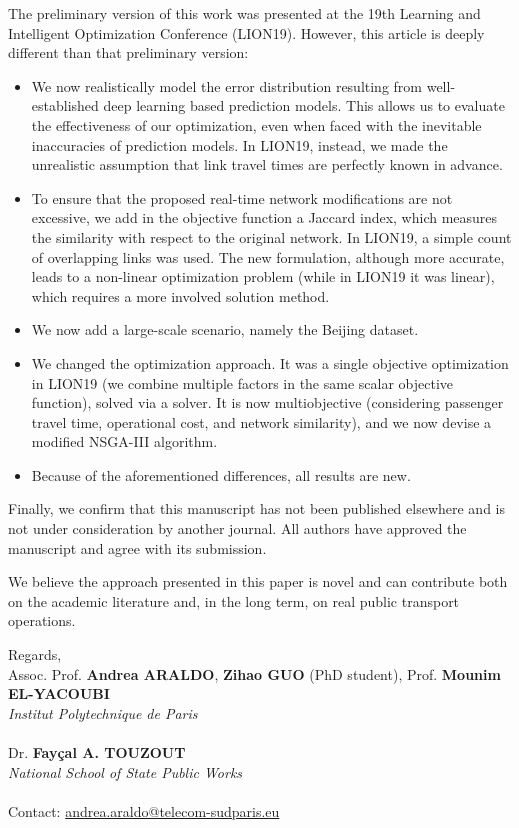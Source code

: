 \documentclass[11pt,a4paper]{letter}
\begin{document}
The preliminary version of this work was presented at the 19th Learning and Intelligent Optimization Conference (LION19). However, this article is deeply different than that preliminary version:
\begin{itemize}
\item We now realistically model the error distribution resulting from well-established deep learning based prediction models. This allows us to evaluate the effectiveness of our optimization, even when faced with the inevitable inaccuracies of prediction models. In LION19, instead, we made the unrealistic assumption that link travel times are perfectly known in advance.
\item To ensure that the proposed real-time network modifications are not excessive, we add in the objective function a Jaccard index, which measures the similarity with respect to the original network. In LION19, a simple count of overlapping links was used. The new formulation, although more accurate, leads to a non-linear optimization problem (while in LION19 it was linear), which requires a more involved solution method.
\item We now add a large-scale scenario, namely the Beijing dataset. 
\item We changed the optimization approach. It was a single objective optimization in LION19 (we combine multiple factors in the same scalar objective function), solved via a solver. It is now multiobjective (considering passenger travel time, operational cost, and network similarity), and we now devise a modified NSGA-III algorithm.
\item Because of the aforementioned differences, all results are new.
\end{itemize}


Finally, we confirm that this manuscript has not been published elsewhere and is not under consideration by another journal. All authors have approved the manuscript and agree with its submission.

We believe the approach presented in this paper is novel and can contribute both on the academic literature and, in the long term, on real public transport operations.

\vspace{0.5cm}

Regards,\\
Assoc. Prof. \textbf{Andrea ARALDO}, \textbf{Zihao GUO} (PhD student), Prof. \textbf{Mounim EL-YACOUBI}\\
\textit{Institut Polytechnique de Paris}\\
\\
Dr. \textbf{Fayçal A. TOUZOUT} \\
\textit{National School of State Public Works}
\\
\\
Contact: \href{mailto:andrea.araldo@telecom-sudparis.eu}{andrea.araldo@telecom-sudparis.eu}
\end{document}
